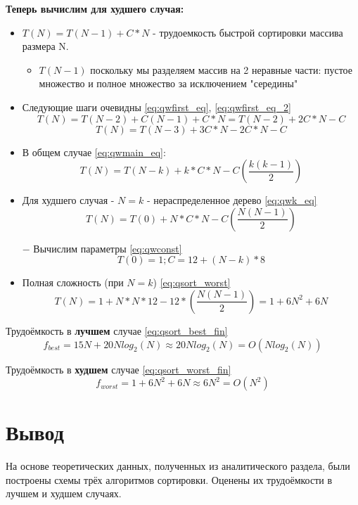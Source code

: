 \textbf{Теперь вычислим для худшего случая:}
\begin{itemize}
    \item $T(N) = T(N - 1) + C*N$ - трудоемкость быстрой сортировки массива размера N.
    \begin{itemize}
        \item $T(N - 1)$ поскольку мы разделяем массив на 2 неравные части: пустое множество и полное множество за исключением "середины"
    \end{itemize}
    \item Следующие шаги очевидны \eqref{eq:qwfirst_eq}, \eqref{eq:qwfirst_eq_2}
    \begin{equation}
        \label{eq:qwfirst_eq}
        T(N) = T(N-2) + C(N-1) + C*N =  T(N-2) + 2C*N - C
    \end{equation}
    \begin{equation}
        \label{eq:qwfirst_eq_2}
        T(N) = T(N-3) + 3C*N - 2C*N - C
    \end{equation}
    \item В общем случае \eqref{eq:qwmain_eq}:
    \begin{equation}
        \label{eq:qwmain_eq}
        T(N) = T(N-k) + k*C*N - C(\frac{k(k-1)}{2})
    \end{equation}
    \item Для худшего случая - $N = k$ - нераспределенное дерево \eqref{eq:qwk_eq}
    \begin{equation}
        \label{eq:qwk_eq}
        T(N) = T(0) + N*C*N - C(\frac{N(N-1)}{2})
    \end{equation}
    \item[$-$] Вычислим параметры \eqref{eq:qwconst}
    \begin{equation}
        \label{eq:qwconst}
        T(0) = 1;
        C = 12 + (N-k) * 8
    \end{equation}
    \item Полная сложность (при $N = k$) \eqref{eq:qsort_worst}
    \begin{equation}
        \label{eq:qsort_worst}
        T(N) = 1 + N*N*12 - 12*(\frac{N(N-1)}{2}) = 1 + 6N^2 + 6N
    \end{equation}
\end{itemize}

Трудоёмкость в \textbf{лучшем} случае \eqref{eq:qsort_best_fin}
\begin{equation}
    \label{eq:qsort_best_fin}
    f_{best} = 15N + 20Nlog_2(N) \approx 20Nlog_2(N) = O(Nlog_2(N))
\end{equation}

Трудоёмкость в \textbf{худшем} случае \eqref{eq:qsort_worst_fin}
\begin{equation}
    \label{eq:qsort_worst_fin}
    f_{worst} = 1 + 6N^2 + 6N \approx 6N^2 = O(N^{2})
\end{equation}
\section*{Вывод}

На основе теоретических данных, полученных из аналитического раздела, были построены схемы трёх алгоритмов сортировки.
Оценены их трудоёмкости в лучшем и худшем случаях.

\clearpage
